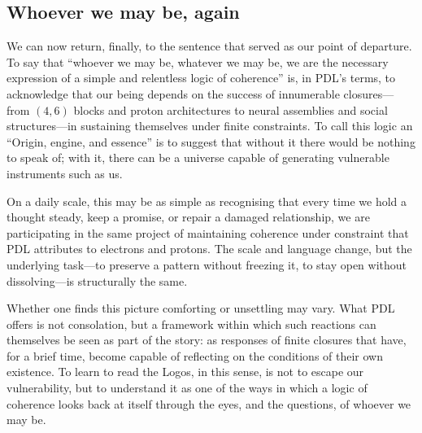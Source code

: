 \documentclass[11pt,a4paper]{article}
\theoremstyle{definition}
\begin{document}
\subsection{Whoever we may be, again}

We can now return, finally, to the sentence that served as our point of departure. To say that ``whoever we may be, whatever we may be, we are the necessary expression of a simple and relentless logic of coherence'' is, in PDL’s terms, to acknowledge that our being depends on the success of innumerable closures---from \((4,6)\) blocks and proton architectures to neural assemblies and social structures---in sustaining themselves under finite constraints.\cite{Laubscher_EmergencePhysicalReality_2024,Laubscher_ProtonArch_v2_2024,Laubscher_Existence_PulsatingClosure_2026} To call this logic an ``Origin, engine, and essence'' is to suggest that without it there would be nothing to speak of; with it, there can be a universe capable of generating vulnerable instruments such as us. 

On a daily scale, this may be as simple as recognising that every time we hold a thought steady, keep a promise, or repair a damaged relationship, we are participating in the same project of maintaining coherence under constraint that PDL attributes to electrons and protons. The scale and language change, but the underlying task—to preserve a pattern without freezing it, to stay open without dissolving—is structurally the same.

Whether one finds this picture comforting or unsettling may vary. What PDL offers is not consolation, but a framework within which such reactions can themselves be seen as part of the story: as responses of finite closures that have, for a brief time, become capable of reflecting on the conditions of their own existence. To learn to read the Logos, in this sense, is not to escape our vulnerability, but to understand it as one of the ways in which a logic of coherence looks back at itself through the eyes, and the questions, of whoever we may be.




\end{document}
